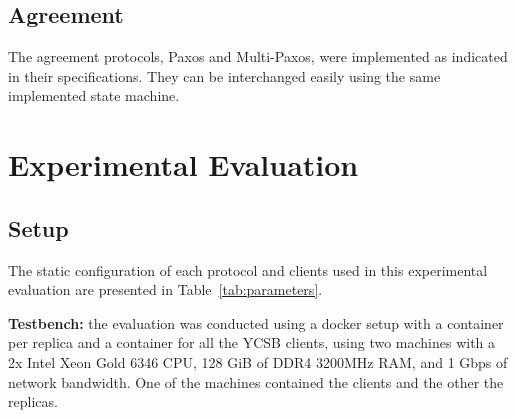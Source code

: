 \documentclass[sigconf]{acmart}
\begin{document}
\subsection{Agreement}

The agreement protocols, Paxos and Multi-Paxos, were implemented as indicated in their specifications. They can be interchanged easily using the same implemented state machine.


\section{Experimental Evaluation}

\subsection{Setup}

\begin{table}[h]
    \centering
    \caption{Protocol Parameters}
    \label{tab:parameters}
\end{table}

The static configuration of each protocol and clients used in this experimental evaluation are presented in Table~\ref{tab:parameters}.

\textbf{Testbench:} the evaluation was conducted using a docker setup with a container per replica and a container for all the YCSB clients, using two machines with a 2x Intel Xeon Gold 6346 CPU, 128 GiB of DDR4 3200MHz RAM, and 1 Gbps of network bandwidth. One of the machines contained the clients and the other the replicas.
\end{document}
